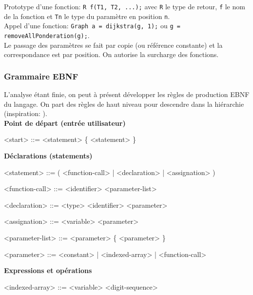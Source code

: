 \documentclass[french]{article}
\begin{document}
				Prototype d'une fonction: \texttt{R f(T1, T2, ...);} avec \texttt{R} le type de retour, \texttt{f} le nom de la fonction et \texttt{Tn} le type du paramètre en position \texttt{n}.\\
				
				Appel d'une fonction: \texttt{Graph a = dijkstra(g, 1);} ou \texttt{g = removeAllPonderation(g);}.\\
				
				Le passage des paramètres se fait par copie (ou référence constante) et la correspondance est par position. On autorise la surcharge des fonctions.
			
			\subsubsection{Grammaire EBNF} 
				L'analyse étant finie, on peut à présent développer les règles de production EBNF du langage. On part des règles de haut niveau pour descendre dans la hiérarchie (inspiration: \cite{vutbr.cz}).\\
				
				\textbf{Point de départ (entrée utilisateur)}
				\begin{grammar}
					<start> ::= <statement> \{ <statement> \}
				\end{grammar}
				
				\textbf{Déclarations (statements)}
				\begin{grammar}
					<statement> ::= ( <function-call> | <declaration> | <assignation> ) \lit{;}
					
					<function-call> ::= <identifier> <parameter-list>
					
					<declaration> ::= <type> <identifier> \lit{=} <parameter>
					
					<assignation> ::= <variable> \lit{=} <parameter>
					
					<parameter-list> ::= \lit{(} <parameter> \{ \lit{,} <parameter> \} \lit{)}
					
					<parameter> ::= <constant> | <indexed-array> | <function-call>
				\end{grammar}
				
				\textbf{Expressions et opérations}
				\begin{grammar}
					<indexed-array> ::= <variable> \lit{[} <digit-sequence> \lit{]}
				\end{grammar}
				
\end{document}
